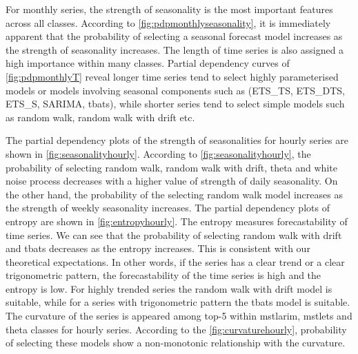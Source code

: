 \documentclass[11pt,a4paper,]{article}
\begin{document}
For monthly series, the strength of seasonality is the most important features across all classes. According to \autoref{fig:pdpmonthlyseasonality}, it is immediately apparent that the probability of selecting a seasonal forecast model increases as the strength of seasonality increases. The length of time series is also assigned a high importance within many classes. Partial dependency curves of \autoref{fig:pdpmonthlyT} reveal longer time series tend to select highly parameterised models or models involving seasonal components such as (ETS\_TS, ETS\_DTS, ETS\_S, SARIMA, tbats), while shorter series tend to select simple models such as random walk, random walk with drift etc.

The partial dependency plots of the strength of seasonalities for hourly series are shown in \autoref{fig:seasonalityhourly}. According to \autoref{fig:seasonalityhourly}, the probability of selecting random walk, random walk with drift, theta and white noise process decreases with a higher value of strength of daily seasonality. On the other hand, the probability of the selecting random walk model increases as the strength of weekly seasonality increases. The partial dependency plots of entropy are shown in \autoref{fig:entropyhourly}. The entropy measures forecastability of time series. We can see that the probability of selecting random walk with drift and tbats decreases as the entropy increases. This is consistent with our theoretical expectations. In other words, if the series has a clear trend or a clear trigonometric pattern, the forecastability of the time series is high and the entropy is low. For highly trended series the random walk with drift model is suitable, while for a series with trigonometric pattern the tbats model is suitable. The curvature of the series is appeared among top-5 within mstlarim, mstlets and theta classes for hourly series. According to the \autoref{fig:curvaturehourly}, probability of selecting these models show a non-monotonic relationship with the curvature.
\end{document}
